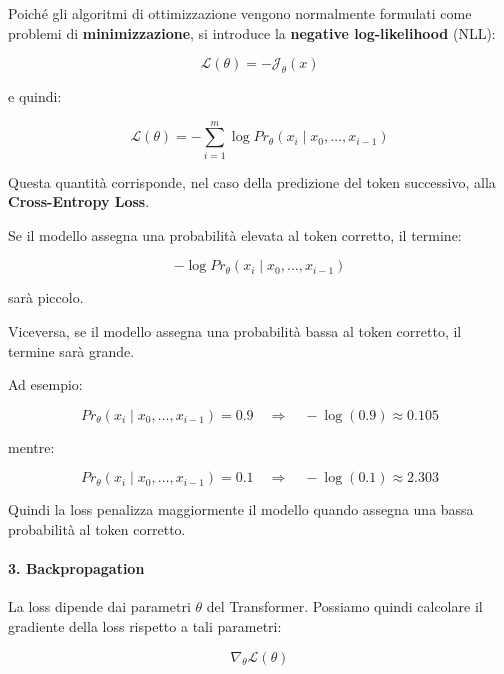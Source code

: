 Poiché gli algoritmi di ottimizzazione vengono normalmente formulati
come problemi di \textbf{minimizzazione}, si introduce la
\textbf{negative log-likelihood} (NLL):

\begin{equation}
\mathcal{L}(\theta)
=
-\mathcal{J}_\theta(x)
\end{equation}

e quindi:

\begin{equation}
\boxed{
\mathcal{L}(\theta)
=
-\sum_{i=1}^{m}
\log Pr_\theta(x_i \mid x_0,\dots,x_{i-1})
}
\end{equation}

Questa quantità corrisponde, nel caso della predizione del token
successivo, alla \textbf{Cross-Entropy Loss}.

Se il modello assegna una probabilità elevata al token corretto,
il termine:

\begin{equation}
-\log Pr_\theta(x_i \mid x_0,\dots,x_{i-1})
\end{equation}

sarà piccolo.

Viceversa, se il modello assegna una probabilità bassa al token
corretto, il termine sarà grande.

Ad esempio:

\begin{equation}
Pr_\theta(x_i \mid x_0,\dots,x_{i-1}) = 0.9
\quad\Rightarrow\quad
-\log(0.9) \approx 0.105
\end{equation}

mentre:

\begin{equation}
Pr_\theta(x_i \mid x_0,\dots,x_{i-1}) = 0.1
\quad\Rightarrow\quad
-\log(0.1) \approx 2.303
\end{equation}

Quindi la loss penalizza maggiormente il modello quando assegna una
bassa probabilità al token corretto.

\paragraph{3. Backpropagation}

La loss dipende dai parametri $\theta$ del Transformer. Possiamo quindi
calcolare il gradiente della loss rispetto a tali parametri:

\begin{equation}
\nabla_\theta \mathcal{L}(\theta)
\end{equation}


